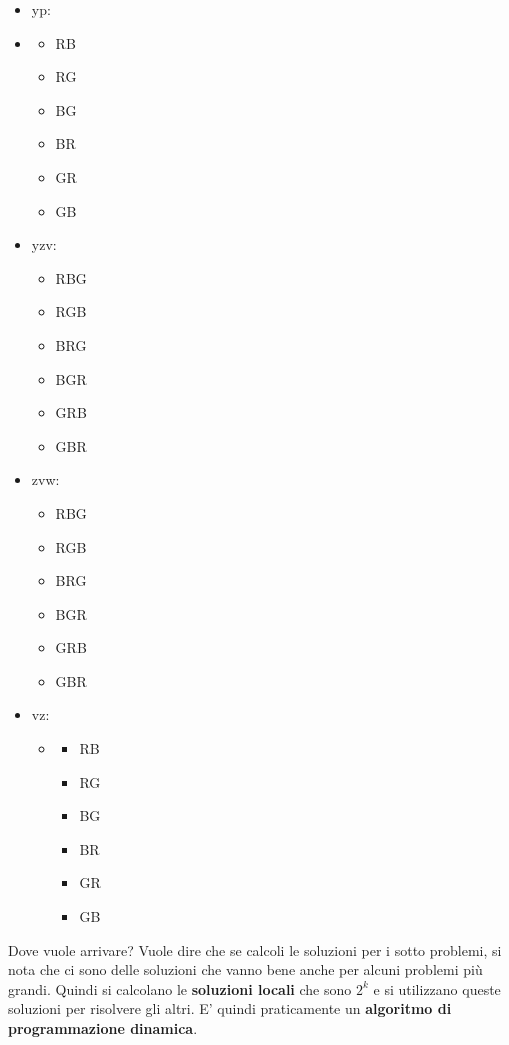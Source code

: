 \begin{itemize}
    \item yp:
    \item \begin{itemize}
              \item RB
              \item RG
              \item BG
              \item BR
              \item GR
              \item GB
          \end{itemize}
    \item yzv:
          \begin{itemize}
              \item RBG
              \item RGB
              \item BRG
              \item BGR
              \item GRB
              \item GBR
          \end{itemize}
    \item zvw:
          \begin{itemize}
              \item RBG
              \item RGB
              \item BRG
              \item BGR
              \item GRB
              \item GBR
          \end{itemize}
    \item vz:
          \begin{itemize}
              \item \begin{itemize}
                        \item RB
                        \item RG
                        \item BG
                        \item BR
                        \item GR
                        \item GB
                    \end{itemize}
          \end{itemize}
\end{itemize}

Dove vuole arrivare? Vuole dire che se calcoli le soluzioni per i sotto problemi, si nota che ci sono delle soluzioni che vanno bene anche per alcuni problemi 
più grandi. Quindi si calcolano le \textbf{soluzioni locali} che sono $2^k$ e si utilizzano queste soluzioni per risolvere gli altri. E' quindi praticamente 
un \textbf{algoritmo di programmazione dinamica}.
\newpage
